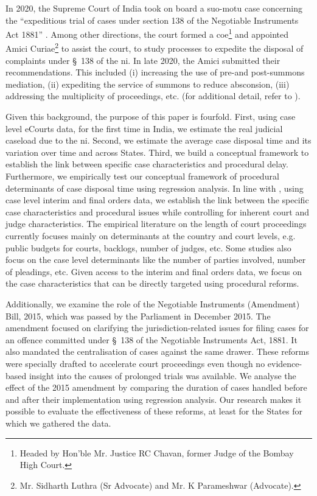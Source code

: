 \documentclass[12pt,a4paper]{article}
\begin{document}
In 2020, the Supreme Court of India took on board a suo-motu case concerning the “expeditious trial of cases under section 138 of the Negotiable Instruments Act 1881” \autocite{sc2020_138}. Among other directions, the court formed a \gls{coe}\footnote{Headed by Hon’ble Mr. Justice RC Chavan, former Judge of the Bombay High Court.} and appointed Amici Curiae\footnote{Mr. Sidharth Luthra (Sr Advocate) and Mr. K Parameshwar (Advocate).} to assist the court, to study processes to expedite the disposal of complaints under \S~138 of the \gls{ni}. In late 2020, the Amici submitted their recommendations. This included (i) increasing the use of pre-and post-summons mediation, (ii) expediting the service of summons to reduce absconsion, (iii) addressing the multiplicity of proceedings, etc. (for additional detail, refer to \cite{amicus2020_submission}).

Given this background, the purpose of this paper is fourfold. First, using case level eCourts data, for the first time in India, we estimate the real judicial caseload due to the \gls{ni}. Second, we estimate the average case disposal time and its variation over time and across States. Third, we build a conceptual framework to establish the link between specific case characteristics and procedural delay. Furthermore, we empirically test our conceptual framework of procedural determinants of case disposal time using regression analysis. In line with \cite{bielen2015}, using case level interim and final orders data, we establish the link between the specific case characteristics and procedural issues while controlling for inherent court and judge characteristics. The empirical literature on the length of court proceedings currently focuses mainly on determinants at the country and court levels, e.g. public budgets for courts, backlogs, number of judges, etc. Some studies also focus on the case level determinants like the number of parties involved, number of pleadings, etc. Given access to the interim and final orders data, we focus on the case characteristics that can be directly targeted using procedural reforms.

Additionally, we examine the role of the Negotiable Instruments (Amendment) Bill, 2015, which was passed by the Parliament in December 2015. The amendment focused on clarifying the jurisdiction-related issues for filing cases for an offence committed under \S~138 of the Negotiable Instruments Act, 1881. It also mandated the centralisation of cases against the same drawer. These reforms were specially drafted to accelerate court proceedings even though no evidence-based insight into the causes of prolonged trials was available. We analyse the effect of the 2015 amendment by comparing the duration of cases handled before and after their implementation using regression analysis. Our research makes it possible to evaluate the effectiveness of these reforms, at least for the States for which we gathered the data.
\end{document}
